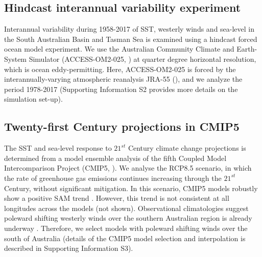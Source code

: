 \documentclass[draft,linenumbers]{agujournal2018}
\begin{document}
\subsection{Hindcast interannual variability experiment}
Interannual variability during 1958-2017 of SST, westerly winds and sea-level in the South Australian Basin and Tasman Sea is examined using a hindcast forced ocean model experiment. We use the Australian Community Climate and Earth-System Simulator (ACCESS-OM2-025, \citealp{Kiss2020}) at quarter degree horizontal resolution, which is ocean eddy-permitting. Here, ACCESS-OM2-025 is forced by the interannually-varying atmospheric reanalysis JRA-55 (\citealp{Kobayashi2015}), and we analyze the period 1978-2017 (Supporting Information S2 provides more details on the simulation set-up).

\subsection{Twenty-first Century projections in CMIP5} \label{Twenty-first Century analysis in CMIP5}
The SST and sea-level response to $21^{st}$ Century climate change projections is determined from a model ensemble analysis of the fifth Coupled Model Intercomparison Project (CMIP5, \citealp{Taylor2012}). We analyse the RCP8.5 scenario, in which the rate of greenhouse gas emissions continues increasing through the $21^{st}$ Century, without significant mitigation. In this scenario, CMIP5 models robustly show a positive SAM trend \citep{Bracegirdle2013}. However, this trend is not consistent at all longitudes across the models (not shown). Observational climatologies suggest poleward shifting westerly winds over the southern Australian region is already underway \citep{Reichler2016}. Therefore, we select models with poleward shifting winds over the south of Australia (details of the CMIP5 model selection and interpolation is described in Supporting Information S3).
\end{document}
